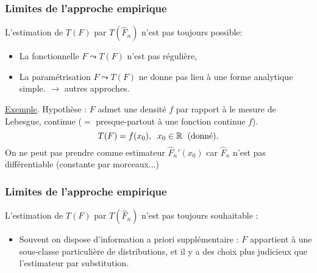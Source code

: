 \begin{frame}
\frametitle{Limites de l'approche empirique} L'estimation de $T(F)$
par $T(\widehat F_n)$ n'est pas toujours \alert{possible}:
%
%
\begin{itemize}
\item La fonctionnelle $F \leadsto T(F)$ n'est pas \og régulière\fg{},
\item La paramétrisation $F \leadsto T(F)$ ne donne \alert{pas} lieu à une \alert{forme analytique simple}.
$\rightarrow$ autres approches.
\end{itemize}
%
\underline{Exemple}. \alert{Hypothèse} : $F$ admet une densité
$f$ par rapport à le mesure de Lebesgue, \alert{continue} ($=$ presque-partout à une fonction continue $f$).
$$T(F) = f(x_0),\;\;x_0\in \operatorname{{\mathbb R}} \,\;\text{(donné)}.$$
On ne \alert{peut pas prendre} comme estimateur $\widehat
F_n'(x_0)$ car $\widehat F_n$ n'est pas diff\'erentiable (constante
par morceaux...)

\end{frame}

\begin{frame}
\frametitle{Limites de l'approche empirique} L'estimation de $T(F)$
par $T(\widehat F_n)$ n'est pas toujours \alert{souhaitable} :
\begin{itemize}
\item
Souvent on dispose d'information \alert{a priori}
supplémentaire : $F$ appartient à une sous-classe \alert{
particulière} de distributions, et il y a des choix plus judicieux
que l'estimateur par substitution.
\end{itemize}
\end{frame}


